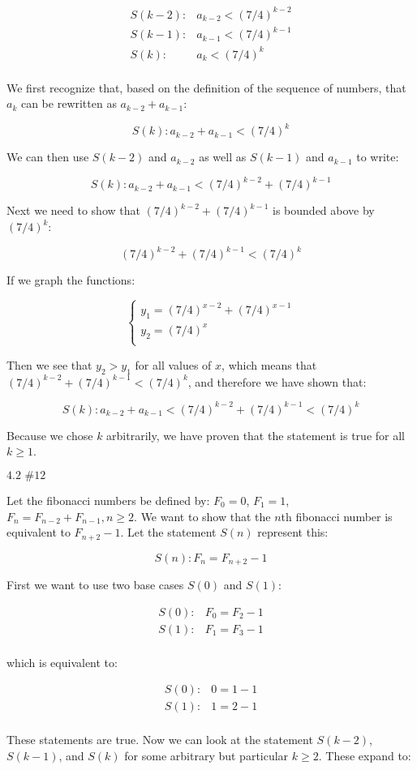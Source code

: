 \documentclass{article}
\newcommand{\problem}[2]{$\boxed{\text{#1 \##2}}$}
\newcommand{\multistep}[1]{\begin{array}{rl} #1 \end{array}}
\begin{document}
\[
\multistep{
S(k-2):&a_{k-2}<(7/4)^{k-2} \\
S(k-1):&a_{k-1}<(7/4)^{k-1} \\
S(k):&a_k<(7/4)^k \\
}
\]

We first recognize that, based on the definition of the sequence of
numbers, that $a_k$ can be rewritten as $a_{k-2}+a_{k-1}$:

\[
S(k):a_{k-2}+a_{k-1}<(7/4)^k
\]

We can then use $S(k-2)$ and $a_{k-2}$ as well as $S(k-1)$ and
$a_{k-1}$ to write:

\[
S(k):a_{k-2}+a_{k-1}<(7/4)^{k-2}+(7/4)^{k-1}
\]

Next we need to show that $(7/4)^{k-2}+(7/4)^{k-1}$ is bounded above
by $(7/4)^k$:

\[
(7/4)^{k-2}+(7/4)^{k-1}<(7/4)^k
\]

If we graph the functions:

\[
\begin{cases}
y_1=(7/4)^{x-2}+(7/4)^{x-1} \\
y_2=(7/4)^x \\
\end{cases}
\]

Then we see that $y_2>y_1$ for all values of $x$, which means that
$(7/4)^{k-2}+(7/4)^{k-1}<(7/4)^k$, and therefore we have shown that:

\[
S(k):a_{k-2}+a_{k-1}<(7/4)^{k-2}+(7/4)^{k-1}<(7/4)^k
\]

Because we chose $k$ arbitrarily, we have proven that the statement is
true for all $k\ge1$.

%
\problem{4.2}{12}

Let the fibonacci numbers be defined by: $F_0=0$, $F_1=1$,
$F_n=F_{n-2}+F_{n-1},n\ge2$. We want to show that the $n$th fibonacci
number is equivalent to $F_{n+2}-1$. Let the statement $S(n)$
represent this:

\[
S(n):F_n=F_{n+2}-1
\]

First we want to use two base cases $S(0)$ and $S(1)$:

\[
\multistep{
S(0):&F_0=F_2-1 \\
S(1):&F_1=F_3-1 \\
}
\]

which is equivalent to:

\[
\multistep{
S(0):&0=1-1 \\
S(1):&1=2-1 \\
}
\]

These statements are true. Now we can look at the statement $S(k-2)$,
$S(k-1)$, and $S(k)$ for some arbitrary but particular $k\ge2$. These
expand to:
\end{document}
